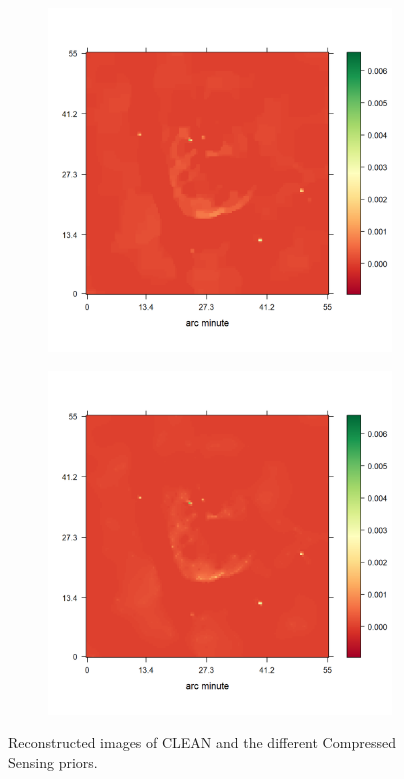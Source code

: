 \begin{figure}[h!]
	\begin{subfigure}[b]{0.32\linewidth}
		\vspace{10pt}
		\includegraphics[width=\linewidth, trim={20px 50px 75px 52px}, clip]{./chapters/05.results/g55/TV_model.png}
	\end{subfigure}
	\begin{subfigure}[b]{0.392\linewidth}
		\includegraphics[width=\linewidth, trim={20px 50px 0px 52px}, clip]{./chapters/05.results/g55/starlets3_model.png}
	\end{subfigure}
	\caption{Reconstructed images of CLEAN and the different Compressed Sensing priors.} 
	\label{res:g55:img}
\end{figure}


